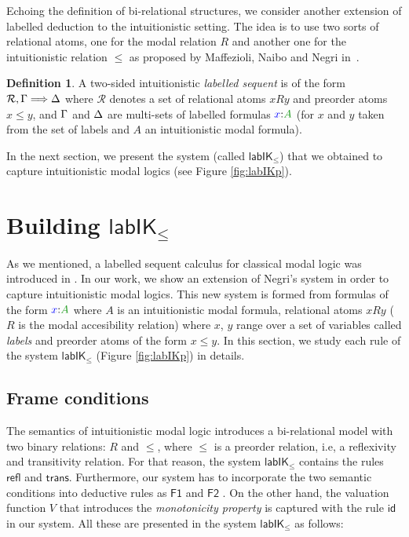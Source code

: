 \documentclass[a4paper]{article}
\theoremstyle{plain}
\theoremstyle{definition}
\newtheorem{definition}[theorem]{Definition}
\newcommand{\B}{\mathcal{R}}
\newcommand*{\lab}{\mathsf{lab}}
\newcommand*{\IK}{\mathsf{IK}}
\newcommand*{\labIKp}{\lab\IK_{\le}}
\newcommand*{\fm}[1]{{\color{notgreen}{#1}}}
\newcommand*{\lb}[1]{{\color{blue}{#1}}}
\newcommand*{\labels}[2]{\lb{#1}\mathord{:}\fm{#2}}
\newcommand{\SEQ}{\Longrightarrow}
\newcommand*{\rn}[1]  {\ensuremath{\mathsf{#1}}}
\newcommand*{\rel}{R}
\begin{document}
Echoing the definition of bi-relational structures, we consider another extension of labelled deduction to the intuitionistic setting. 
%
The idea is to use two sorts of relational atoms, one for the modal relation $\rel$ and another one for the intuitionistic relation $\leq$ as proposed by Maffezioli, Naibo and Negri in~\cite{Maffezioli}. 
%

\begin{definition}
A two-sided intuitionistic \emph{labelled sequent} is of the form $\B, \Left \SEQ \Right$ where $\B$ denotes a set of relational atoms $x \rel y$ and preorder atoms $x \le y$, and $\Gamma$ and $\Delta$ are multi-sets of labelled formulas $\labels{x}{A}$ (for $x$ and $y$ taken from the set of labels and $A$ an intuitionistic modal formula).
\end{definition}
In the next section, we present the system (called $\labIKp$) that we obtained to capture intuitionistic modal logics (see Figure \ref{fig:labIKp}).

\section{Building $\labIKp$}

As we mentioned, a labelled sequent calculus for classical modal logic was introduced in \cite{Negri}. In our work, we show an extension of Negri's system in order to capture intuitionistic modal logics. This new system is formed from formulas of the form $\labels{x}{A}$ where $A$ is an intuitionistic modal formula, relational atoms $xRy$ ($R$ is the modal accesibility relation) where $x$, $y$ range over a set of variables called \emph{labels} and preorder atoms of the form $x \le y$. In this section, we study each rule of the system $\labIKp$ (Figure \ref{fig:labIKp}) in details. 

\subsection{Frame conditions}
The semantics of intuitionistic modal logic introduces a bi-relational model with two binary relations: $R$ and $\le$, where $\le$ is a preorder relation, i.e, a reflexivity and transitivity relation. For that reason, the system $\labIKp$ contains the rules $\rn{refl}$ and $\rn{trans}$. Furthermore, our system has to incorporate the two semantic conditions into deductive rules as $\rn{F1}$ and $\rn{F2}$ . On the other hand, the valuation function $V$ that introduces the \emph{monotonicity property} is captured with the rule $\rn{id}$ in our system. All these are presented in the system $\labIKp$ as follows:
\end{document}
